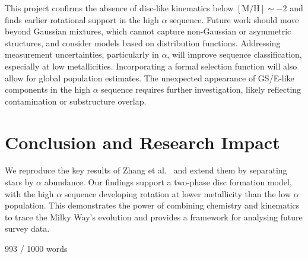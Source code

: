 \documentclass[a4paper,10pt]{article}
\begin{document}
\begin{multicols}{2}
This project confirms the absence of disc-like kinematics below $\mathrm{[M/H]} \sim -2$ 
and finds earlier rotational support in the high $\alpha$ sequence. Future work should move 
beyond Gaussian mixtures, which cannot capture non-Gaussian or asymmetric structures, and 
consider models based on distribution functions. Addressing measurement uncertainties, 
particularly in $\alpha$, will improve sequence classification, especially 
at low metallicities. Incorporating a formal selection function will also allow for global 
population estimates. The unexpected appearance of GS/E-like components in the high $\alpha$ 
sequence requires further investigation, likely reflecting contamination or substructure overlap.

\section*{Conclusion and Research Impact}

We reproduce the key results of Zhang et al.~ \cite{zhang2024existencemetalpoordiscmilky} and 
extend them by separating stars by $\alpha$ abundance. Our findings support a two-phase disc 
formation model, with the high $\alpha$ sequence developing rotation at lower metallicity than 
the low $\alpha$ population. This demonstrates the power of combining chemistry and kinematics to 
trace the Milky Way’s evolution and provides a framework for analysing future survey data.

\newpage{}

993 / 1000 words








  


\end{multicols}
\end{document}
